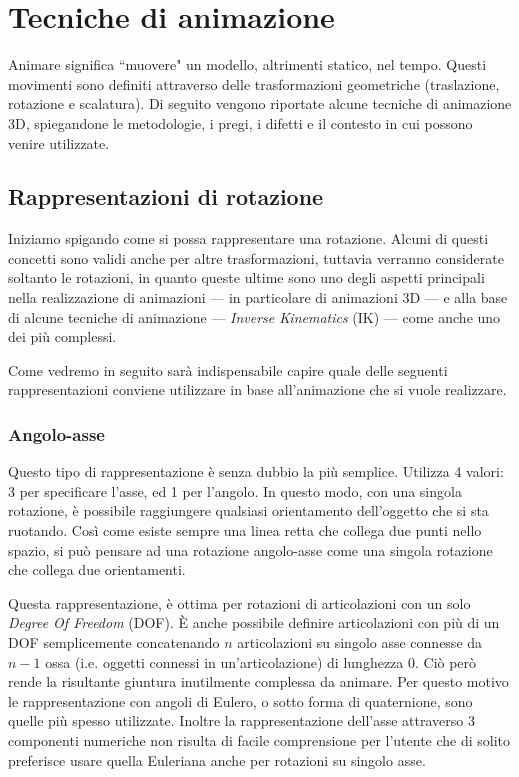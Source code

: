 
\chapter{Tecniche di animazione} %

\label{Chapter3} %

Animare significa ``muovere" un modello, altrimenti statico, nel tempo. Questi movimenti sono definiti attraverso delle trasformazioni geometriche (traslazione, rotazione e scalatura).
Di seguito vengono riportate alcune tecniche di animazione 3D, spiegandone le metodologie, i pregi, i difetti e il contesto in cui possono venire utilizzate. 


\section{Rappresentazioni di rotazione}\label{Section3.1}
Iniziamo spigando come si possa rappresentare una rotazione. Alcuni di questi concetti sono validi anche per altre trasformazioni, tuttavia verranno considerate soltanto le rotazioni, in quanto queste ultime sono uno degli aspetti principali nella realizzazione di animazioni --- in particolare di animazioni 3D --- e alla base di alcune tecniche di animazione --- \emph{Inverse Kinematics} (IK) --- come anche uno dei più complessi. 

Come vedremo in seguito sarà indispensabile capire quale delle seguenti rappresentazioni conviene utilizzare in base all'animazione che si vuole realizzare.


\subsection{Angolo-asse}
Questo tipo di rappresentazione è senza dubbio la più semplice.
Utilizza 4 valori: 3 per specificare l'asse, ed 1 per l'angolo. In questo modo, con una singola rotazione, è possibile raggiungere qualsiasi orientamento dell'oggetto che si sta ruotando. Così come esiste sempre una linea retta che collega due punti nello spazio, si può pensare ad una rotazione angolo-asse come una singola rotazione che collega due orientamenti.

Questa rappresentazione, è ottima per rotazioni di articolazioni con un solo \emph{Degree Of Freedom} (DOF). È anche possibile definire articolazioni con più di un DOF semplicemente concatenando $n$ articolazioni su singolo asse connesse da $n-1$ ossa (i.e. oggetti connessi in un'articolazione) di lunghezza 0. Ciò però rende la risultante giuntura inutilmente complessa da animare. Per questo motivo le rappresentazione con angoli di Eulero, o sotto forma di quaternione, sono quelle più spesso utilizzate. Inoltre la rappresentazione dell'asse attraverso 3 componenti numeriche non risulta di facile comprensione per l'utente che di solito preferisce usare quella Euleriana anche per rotazioni su singolo asse.

